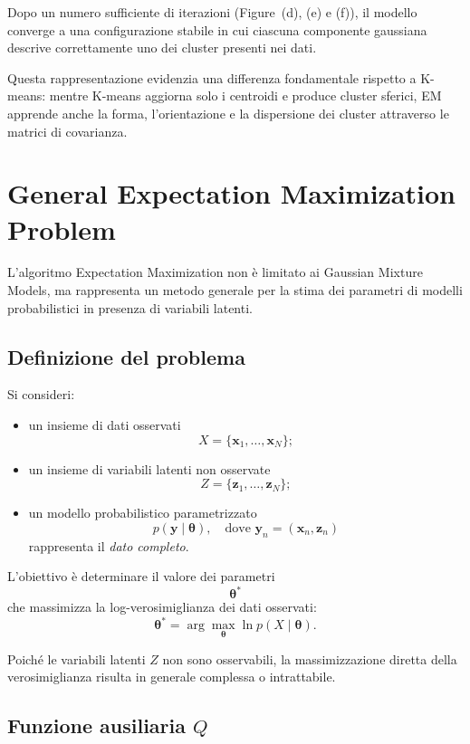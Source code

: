 \documentclass[a4paper,12pt]{report}
\begin{document}
Dopo un numero sufficiente di iterazioni (Figure~(d), (e) e (f)), il modello converge a una configurazione stabile in cui ciascuna componente gaussiana descrive correttamente uno dei cluster presenti nei dati.

Questa rappresentazione evidenzia una differenza fondamentale rispetto a K-means:
mentre K-means aggiorna solo i centroidi e produce cluster sferici,
EM apprende anche la forma, l’orientazione e la dispersione dei cluster attraverso le matrici di covarianza.

\section{General Expectation Maximization Problem}

L’algoritmo Expectation Maximization non è limitato ai Gaussian Mixture Models, ma rappresenta un metodo generale per la stima dei parametri di modelli probabilistici in presenza di variabili latenti.

\subsection{Definizione del problema}

Si consideri:
\begin{itemize}
    \item un insieme di dati osservati
    \[
    X = \{ \mathbf{x}_1, \dots, \mathbf{x}_N \};
    \]
    \item un insieme di variabili latenti non osservate
    \[
    Z = \{ \mathbf{z}_1, \dots, \mathbf{z}_N \};
    \]
    \item un modello probabilistico parametrizzato
    \[
    p(\mathbf{y} \mid \boldsymbol{\theta}),
    \quad \text{dove } \mathbf{y}_n = (\mathbf{x}_n, \mathbf{z}_n)
    \]
    rappresenta il \emph{dato completo}.
\end{itemize}

L’obiettivo è determinare il valore dei parametri
\[
\boldsymbol{\theta}^*
\]
che massimizza la log-verosimiglianza dei dati osservati:
\[
\boldsymbol{\theta}^* = \arg\max_{\boldsymbol{\theta}} \ln p(X \mid \boldsymbol{\theta}).
\]

Poiché le variabili latenti $Z$ non sono osservabili, la massimizzazione diretta della verosimiglianza risulta in generale complessa o intrattabile.

\subsection{Funzione ausiliaria $Q$}
\end{document}
